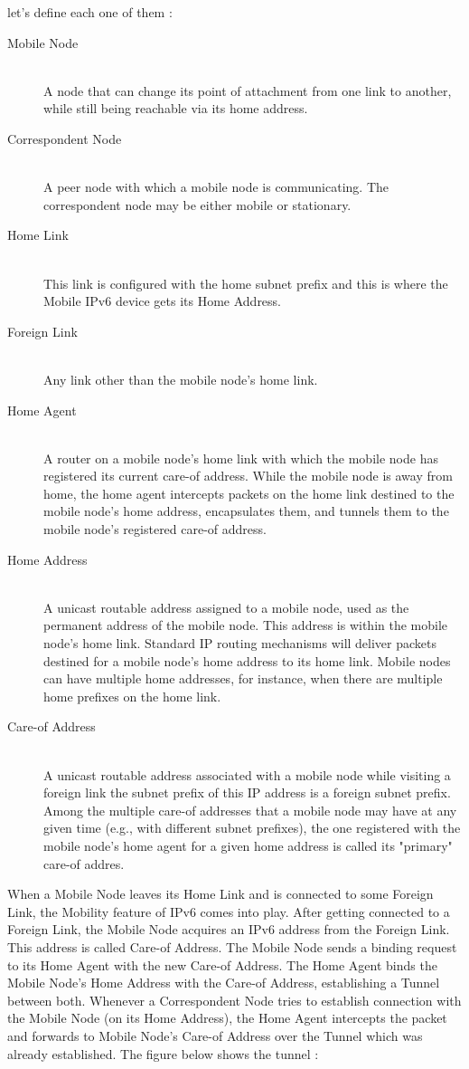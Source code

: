 \documentclass{article}
\begin{document}
let's define each one of them :
\begin{description}
  \item[Mobile Node] \hfill \\ 
A node that can change its point of attachment from one link to
another, while still being reachable via its home address.
  \item[Correspondent Node] \hfill \\
A peer node with which a mobile node is communicating.  The
correspondent node may be either mobile or stationary.
  \item[Home Link] \hfill \\ 
This link is configured with the home subnet prefix and this is where
the Mobile IPv6 device gets its Home Address.
  \item[Foreign Link] \hfill \\
Any link other than the mobile node's home link.
  \item[Home Agent] \hfill \\ 
A router on a mobile node's home link with which the mobile node has
registered its current care-of address.  While the mobile node is away
from home, the home agent intercepts packets on the home link destined
to the mobile node's home address, encapsulates them, and tunnels them
to the mobile node's registered care-of address.
  \item[Home Address] \hfill \\ 
A unicast routable address assigned to a mobile node, used as the
permanent address of the mobile node.  This address is within the
mobile node's home link.  Standard IP routing mechanisms will deliver
packets destined for a mobile node's home address to its home link.
Mobile nodes can have multiple home addresses, for instance, when
there are multiple home prefixes on the home link.
  \item[Care-of Address] \hfill \\
A unicast routable address associated with a mobile node while
visiting a foreign link the subnet prefix of this IP address is a
foreign subnet prefix.  Among the multiple care-of addresses that a
mobile node may have at any given time (e.g., with different subnet
prefixes), the one registered with the mobile node's home agent for a
given home address is called its "primary" care-of addres.

\end{description}


When a Mobile Node leaves its Home Link and is connected to some
Foreign Link, the Mobility feature of IPv6 comes into play. After
getting connected to a Foreign Link, the Mobile Node acquires an IPv6
address from the Foreign Link. This address is called Care-of
Address. The Mobile Node sends a binding request to its Home Agent
with the new Care-of Address. The Home Agent binds the Mobile Node’s
Home Address with the Care-of Address, establishing a Tunnel between
both. Whenever a Correspondent Node tries to establish connection with
the Mobile Node (on its Home Address), the Home Agent intercepts the
packet and forwards to Mobile Node’s Care-of Address over the Tunnel
which was already established. The figure below shows the tunnel :
\end{document}

